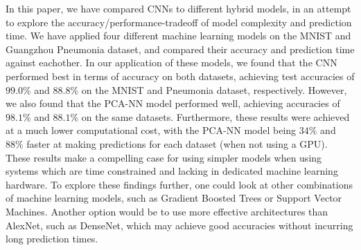 \documentclass[onecolumn,10pt,cleanfoot]{asme2ej}
\begin{document}
In this paper, we have compared CNNs to different hybrid models, in an attempt to explore the accuracy/performance-tradeoff of model complexity and prediction time. We have applied four different machine learning models on the MNIST and Guangzhou Pneumonia dataset, and compared their accuracy and prediction time against eachother. In our application of these models, we found that the CNN performed best in terms of accuracy on both datasets, achieving test accuracies of $99.0\%$ and $88.8\%$ on the MNIST and Pneumonia dataset, respectively. However, we also found that the PCA-NN model performed well, achieving accuracies of $98.1\%$ and $88.1\%$ on the same datasets. Furthermore, these results were achieved at a much lower computational cost, with the PCA-NN model being $34\%$ and $88\%$ faster at making predictions for each dataset (when not using a GPU). These results make a compelling case for using simpler models when using systems which are time constrained and lacking in dedicated machine learning hardware. To explore these findings further, one could look at other combinations of machine learning models, such as Gradient Boosted Trees or Support Vector Machines. Another option would be to use more effective architectures than AlexNet, such as DenseNet, which may achieve good accuracies without incurring long prediction times.



\end{document}
